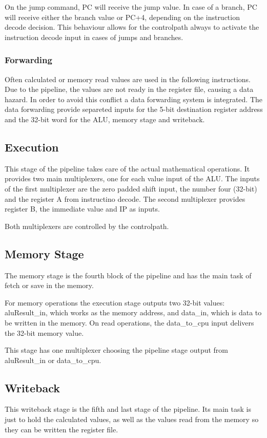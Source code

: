 On the jump command, PC will receive the jump value. 
In case of a branch, PC will receive either the branch value or PC+4, depending on the instruction decode decision. This behaviour allows for the controlpath always to 
activate the instruction decode input in cases of jumps and branches.
\subsubsection{Forwarding}
Often calculated or memory read values are used in the following instructions. Due to the pipeline, the values are not ready in the register file, causing a data hazard. In order to avoid this conflict
a data forwarding system is integrated. The data forwarding provide separeted inputs for the 5-bit destination register address and the 32-bit word for the ALU, memory stage and writeback.


\subsection{Execution}
This stage of the pipeline takes care of the actual mathematical operations. It provides two main multiplexers, one for each value input of the ALU.
The inputs of the first multiplexer are the zero padded shift input, the number four (32-bit) and the register A from instructino decode. The second multiplexer provides register B, 
the immediate value and IP as inputs.

Both multiplexers are controlled by the controlpath.
\subsection{Memory Stage}
The memory stage is the fourth block of the pipeline and has the main task of fetch or save in the memory. 

For memory operations the execution stage outputs two 32-bit values: aluResult\_in, which works as the memory address, and data\_in, which is data to be written in the memory. 
On read operations, the data\_to\_cpu input delivers the 32-bit memory value.

This stage has one multiplexer choosing the pipeline stage output from aluResult\_in or data\_to\_cpu.
\subsection{Writeback}
This writeback stage is the fifth and last stage of the pipeline. Its main task is just to hold the calculated values, as well as the values read from the memory 
so they can be written the register file.
